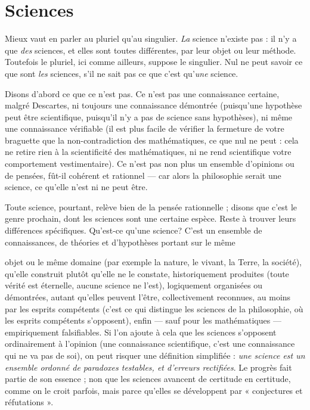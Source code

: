 \section{Sciences}
Mieux vaut en parler au pluriel qu’au singulier. {\it La} science
n'existe pas : il n’y a que {\it des} sciences, et elles sont toutes différentes,
par leur objet ou leur méthode. Toutefois le pluriel, ici comme ailleurs,
suppose le singulier. Nul ne peut savoir ce que sont {\it les} sciences, s’il ne sait pas
ce que c’est qu’{\it une} science.

Disons d’abord ce que ce n’est pas. Ce n’est pas une connaissance certaine,
malgré Descartes, ni toujours une connaissance démontrée (puisqu’une hypothèse
peut être scientifique, puisqu'il n’y a pas de science sans hypothèses), ni
même une connaissance vérifiable (il est plus facile de vérifier la fermeture de
votre braguette que la non-contradiction des mathématiques, ce que nul ne
peut : cela ne retire rien à la scientificité des mathématiques, ni ne rend scientifique
votre comportement vestimentaire). Ce n’est pas non plus un ensemble
d'opinions ou de pensées, fût-il cohérent et rationnel — car alors la philosophie
serait une science, ce qu’elle n’est ni ne peut être.

Toute science, pourtant, relève bien de la pensée rationnelle ; disons que
c'est le genre prochain, dont les sciences sont une certaine espèce. Reste à
trouver leurs différences spécifiques. Qu'est-ce qu’une science? C’est un
ensemble de connaissances, de théories et d’hypothèses portant sur le même

objet ou le même domaine (par exemple la nature, le vivant, la Terre, la
société), qu’elle construit plutôt qu’elle ne le constate, historiquement produites
(toute vérité est éternelle, aucune science ne l’est), logiquement organisées
ou démontrées, autant qu’elles peuvent l'être, collectivement reconnues, au
moins par les esprits compétents (c’est ce qui distingue les sciences de la philosophie,
où les esprits compétents s’opposent), enfin — sauf pour les mathématiques —
empiriquement falsifiables. Si l’on ajoute à cela que les sciences s’opposent
ordinairement à l’opinion (une connaissance scientifique, c'est une
connaissance qui ne va pas de soi), on peut risquer une définition simplifiée :
{\it une science est un ensemble ordonné de paradoxes testables, et d'erreurs rectifiées}. Le
progrès fait partie de son essence ; non que les sciences avancent de certitude en
certitude, comme on le croit parfois, mais parce qu’elles se développent par
« conjectures et réfutations ».

